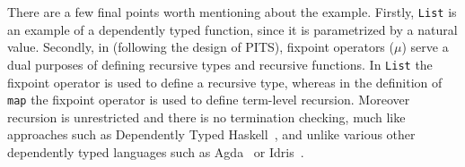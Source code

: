 
There are a few final points worth mentioning about the example.
Firstly, \verb|List| is an example of a dependently typed function, since it is parametrized
by a natural value. Secondly, in \name (following the design of PITS),
fixpoint operators ($\mu$) serve a dual purposes of defining recursive types and recursive
functions. In \verb|List| the fixpoint operator is used to define a recursive type, whereas
in the definition of \verb|map| the fixpoint operator is used to define term-level recursion.
Moreover recursion is unrestricted and there is no termination checking, much like approaches
such as Dependently Typed Haskell~\cite{}, and unlike various other dependently typed languages
such as Agda~\cite{} or Idris~\cite{}.


\begin{comment}
  can not only be types, also values of other data types
(in this case, $\Nat$). So our language is able to directly encode the behavior of
``Datatype Promotion'' of GHC haskell. The type parameters of $\List$ at most
positions can be implicit parameter and instantiated during application.

\paragraph{Fixpoint Operators}
In our language, fixpoint operators ($\mu$) serves a dual purposes of defining
recursive data type and recursive functions. However we put restrictions on
fixpoint that its type can not be poly-type. So there is an awkward indirection
in the definition of $\map$ to make all of the type parameters implicit. The rationale
of this restriction is discussed in later sections.

\paragraph{Explicit Type-Level Computations}
The type-level computations of our language do not happen implicitly, they happen
explicitly when $\mathrm{cast}$ operators are used. $\castdn$ and $\castup$
generalize the ``unfold'' and ``fold'' of Iso-Recursive Types and invoke
one-step reduction or expansion respectively at type-level.
They also serve a role of wrapping and unwrapping the abstraction of data types.
\end{comment}

